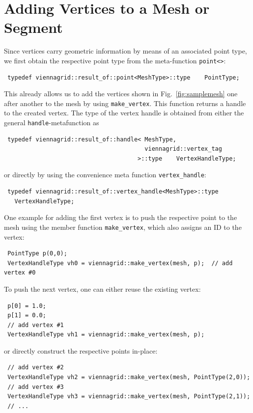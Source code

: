 \pagebreak

\section{Adding Vertices to a Mesh or Segment}
Since vertices carry geometric information by means of an associated point type, we first obtain the respective point type from the meta-function \lstinline|point<>|:
\begin{lstlisting}
 typedef viennagrid::result_of::point<MeshType>::type    PointType;
\end{lstlisting}
This already allows us to add the vertices shown in Fig.~\ref{fig:samplemesh} one after another to the mesh by using \lstinline|make_vertex|.
This function returns a handle to the created vertex.
The type of the vertex handle is obtained from either the general \texttt{handle}-metafunction as
\begin{lstlisting}
 typedef viennagrid::result_of::handle< MeshType,
                                        viennagrid::vertex_tag
                                      >::type    VertexHandleType;
\end{lstlisting}
or directly by using the convenience meta function \lstinline|vertex_handle|:
\begin{lstlisting}
 typedef viennagrid::result_of::vertex_handle<MeshType>::type 
   VertexHandleType;
\end{lstlisting}
One example for adding the first vertex is to push the respective point to the mesh using the member function \lstinline|make_vertex|, which also assigns an ID to the vertex:
\begin{lstlisting}
 PointType p(0,0);
 VertexHandleType vh0 = viennagrid::make_vertex(mesh, p);  // add vertex #0
\end{lstlisting} 

To push the next vertex, one can either reuse the existing vertex:
\begin{lstlisting}
 p[0] = 1.0;
 p[1] = 0.0;
 // add vertex #1
 VertexHandleType vh1 = viennagrid::make_vertex(mesh, p);
\end{lstlisting}

or directly construct the respective points in-place:
\begin{lstlisting}
 // add vertex #2
 VertexHandleType vh2 = viennagrid::make_vertex(mesh, PointType(2,0));
 // add vertex #3
 VertexHandleType vh3 = viennagrid::make_vertex(mesh, PointType(2,1));
 // ...
\end{lstlisting}

